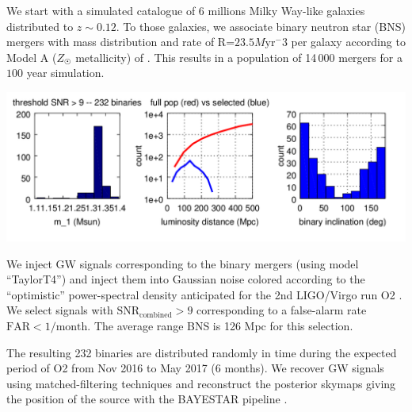 \documentclass[a0,portrait]{a0poster}
\begin{document}
\begin{multicols}{2}
We start with a simulated catalogue of 6 millions Milky Way-like galaxies
distributed to $z\sim 0.12$. To those galaxies, we associate binary neutron star
(BNS) mergers with mass distribution and rate of R=$23.5 M\mathrm{yr}^-3$ per galaxy
according to Model A ($Z_{\astrosun}$ metallicity) of
\cite{dominik12:_doubl_compac_objec}. This results in a population of 14\,000
mergers for a $100$ year simulation.

\begin{center}\vspace{.5cm}
    \includegraphics[width=30cm]{figures/summary_plot.png}
\end{center}

We inject GW signals corresponding to the binary mergers (using model
``TaylorT4'') and inject them into Gaussian noise colored according to the
``optimistic'' power-spectral density anticipated for the 2nd LIGO/Virgo run O2
\cite{lrr-2016-1}. We select signals with $\mathrm{SNR}_{\mathrm{combined}} > 9$
corresponding to a false-alarm rate $\mathrm{FAR} < 1/\mathrm{month}$. The average range
BNS is 126 Mpc for this selection.

The resulting 232 binaries are distributed randomly in time during the expected
period of O2 from Nov 2016 to May 2017 (6 months). We recover GW signals using
matched-filtering techniques and reconstruct the posterior skymaps giving the
position of the source with the BAYESTAR pipeline \cite{PhysRevD.93.024013}.



\end{multicols}
\end{document}
